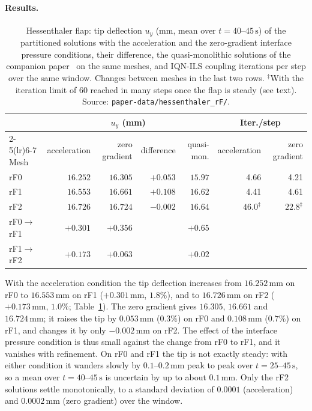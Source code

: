 \paragraph{Results.}
\begin{table}[htbp]
	\centering
	\small
	\setlength{\tabcolsep}{4pt}
	\caption{Hessenthaler flap: tip deflection $u_y$ (mm, mean over $t = 40$--$45\,\mathrm{s}$) of the partitioned solutions with the acceleration and the zero-gradient interface pressure conditions, their difference, the quasi-monolithic solutions of the companion paper~\citep{CardiffBatistic2026QM} on the same meshes, and IQN-ILS coupling iterations per step over the same window. Changes between meshes in the last two rows. ${}^{\ddagger}$With the iteration limit of 60 reached in many steps once the flap is steady (see text). Source: \texttt{paper-data/hessenthaler\_rF/}.}
	\label{tab:hessenthaler_results}
	\begin{tabular}{lrrrrrr}
		\toprule
		 & \multicolumn{4}{c}{$u_y$ (mm)} & \multicolumn{2}{c}{Iter./step} \\
		\cmidrule(lr){2-5}\cmidrule(lr){6-7}
		Mesh & acceleration & zero gradient & difference & quasi-mon. & acceleration & zero gradient \\
		\midrule
		rF0 & $16.252$ & $16.305$ & $+0.053$ & $15.97$ & 4.66 & 4.21 \\
		rF1 & $16.553$ & $16.661$ & $+0.108$ & $16.62$ & 4.41 & 4.61 \\
		rF2 & $16.726$ & $16.724$ & $-0.002$ & $16.64$ & $46.0^{\ddagger}$ & $22.8^{\ddagger}$ \\
		\midrule
		rF0$\to$rF1 & $+0.301$ & $+0.356$ & & $+0.65$ & & \\
		rF1$\to$rF2 & $+0.173$ & $+0.063$ & & $+0.02$ & & \\
		\bottomrule
	\end{tabular}
\end{table}
With the acceleration condition the tip deflection increases from $16.252\,\mathrm{mm}$ on rF0 to $16.553\,\mathrm{mm}$ on rF1 ($+0.301\,\mathrm{mm}$, $1.8\%$), and to $16.726\,\mathrm{mm}$ on rF2 ($+0.173\,\mathrm{mm}$, $1.0\%$; Table~\ref{tab:hessenthaler_results}).
The zero gradient gives $16.305$, $16.661$ and $16.724\,\mathrm{mm}$; it raises the tip by $0.053\,\mathrm{mm}$ ($0.3\%$) on rF0 and $0.108\,\mathrm{mm}$ ($0.7\%$) on rF1, and changes it by only $-0.002\,\mathrm{mm}$ on rF2. The effect of the interface pressure condition is thus small against the change from rF0 to rF1, and it vanishes with refinement.
On rF0 and rF1 the tip is not exactly steady: with either condition it wanders slowly by $0.1$--$0.2\,\mathrm{mm}$ peak to peak over $t = 25$--$45\,\mathrm{s}$, so a mean over $t = 40$--$45\,\mathrm{s}$ is uncertain by up to about $0.1\,\mathrm{mm}$. Only the rF2 solutions settle monotonically, to a standard deviation of $0.0001$ (acceleration) and $0.0002\,\mathrm{mm}$ (zero gradient) over the window.

